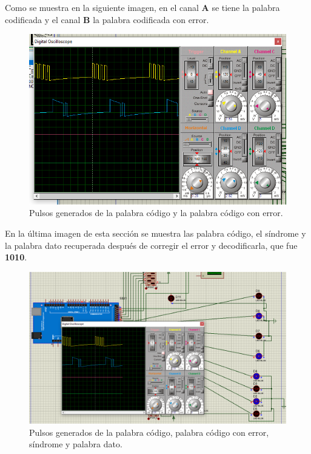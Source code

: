 \documentclass[12pt,letterpaper]{article}
\begin{document}
\newpage
Como se muestra en la siguiente imagen, en el canal \textbf{A} se tiene la palabra codificada y el 
canal \textbf{B} la palabra codificada con error.
\begin{figure}[ht]
    \centering
    \includegraphics[width=1\textwidth]{simu1.png}
    \caption{Pulsos generados de la palabra código y la palabra código con error.}
\end{figure}
\newpage
En la última imagen de esta sección se muestra las palabra código, el síndrome y la palabra 
dato recuperada después de corregir el error y decodificarla, que fue \textbf{1010}.
\begin{figure}[ht]
    \centering
    \includegraphics[width=1\textwidth]{simu2.png}
	\caption{Pulsos generados de la palabra código, palabra código con error, síndrome y 
	palabra dato.}
\end{figure}

\newpage
\end{document}
